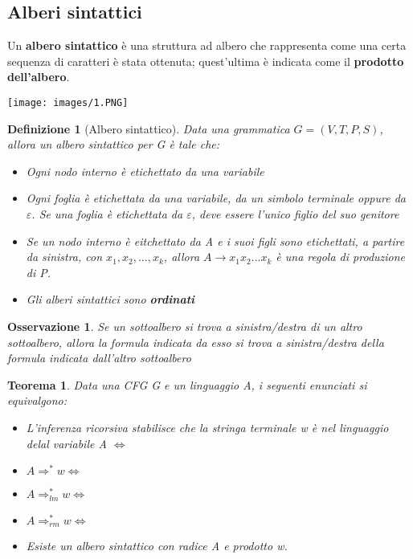 \documentclass[12pt]{article}
\newtheorem{Definizione}{Definizione}[subsection]
\newtheorem{Teorema}{Teorema}[subsection]
\newtheorem{Osservazione}{Osservazione}[subsection]
\begin{document}
\subsection{Alberi sintattici}
Un \textbf{albero sintattico} è una struttura ad albero che rappresenta come una certa sequenza di caratteri è stata ottenuta; quest'ultima è indicata come il \textbf{prodotto dell'albero}.
\begin{center}
    \texttt{[image: images/1.PNG]}
\end{center}
\begin{Definizione}[Albero sintattico]
    Data una grammatica $G = (V, T, P, S)$, allora un albero sintattico per G è tale che:
    \begin{itemize}
        \item Ogni nodo interno è etichettato da una variabile
        \item Ogni foglia è etichettata da una variabile, da un simbolo terminale oppure da $\varepsilon$. Se una foglia è etichettata da $\varepsilon$, deve essere l'unico figlio del suo genitore
        \item Se un nodo interno è eitchettato da A e i suoi figli sono etichettati, a partire da sinistra, con $x_1, x_2, ..., x_k$, allora $A \to x_1x_2...x_k$ è una regola di produzione di P.
        \item Gli alberi sintattici sono \textbf{ordinati}
    \end{itemize}
\end{Definizione}
\begin{Osservazione}
    Se un sottoalbero si trova a sinistra/destra di un altro sottoalbero, allora la formula indicata da esso si trova a sinistra/destra della formula indicata dall'altro sottoalbero
\end{Osservazione}
\begin{Teorema}
    Data una CFG G e un linguaggio A, i seguenti enunciati si equivalgono:
    \begin{itemize}
        \item L'inferenza ricorsiva stabilisce che la stringa terminale w è nel linguaggio delal variabile A $\Leftrightarrow$
        \item $A \Rightarrow^* w \Leftrightarrow$
        \item $A \Rightarrow_{lm}^* w \Leftrightarrow$ 
        \item $A \Rightarrow_{rm}^* w \Leftrightarrow$
        \item Esiste un albero sintattico con radice A e prodotto w.
    \end{itemize}    
\end{Teorema}
\end{document}
